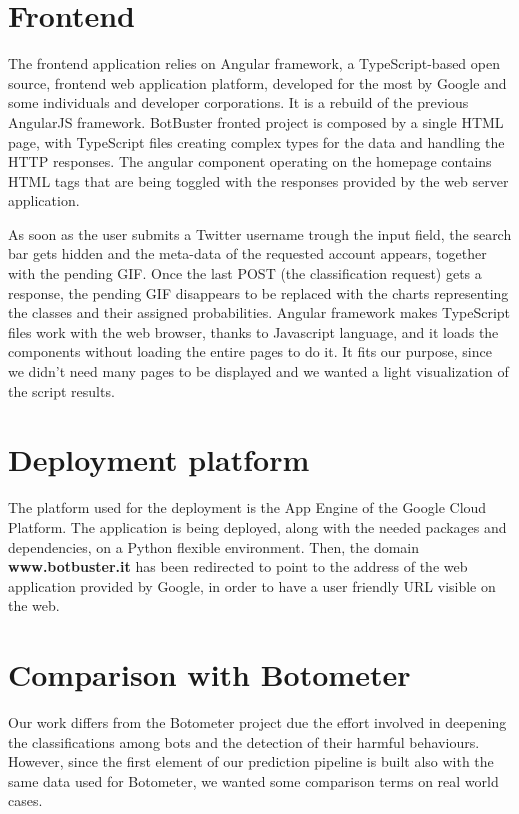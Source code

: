 \section{Frontend}
The frontend application relies on Angular framework, a TypeScript-based open source, frontend web application platform, developed for the most by Google and some individuals and developer corporations.
It is a rebuild of the previous AngularJS framework.
BotBuster fronted project is composed by a single HTML page, with TypeScript files creating complex types for the data and handling the HTTP responses.
The angular component operating on the homepage contains HTML tags that are being toggled with the responses provided by the web server application.

As soon as the user submits a Twitter username trough the input field, the search bar gets hidden and the meta-data of the requested account appears, together with the pending GIF. Once the last POST (the classification request) gets a response, the pending GIF disappears to be replaced with the charts representing the classes and their assigned probabilities. 
Angular framework makes TypeScript files work with the web browser, thanks to Javascript language, and it loads the components without loading the entire pages to do it. It fits our purpose, since we didn't need many pages to be displayed and we wanted a light visualization of the script results.

\section{Deployment platform}
The platform used for the deployment is the App Engine of the Google Cloud Platform.
The application is being deployed, along with the needed packages and dependencies, on a Python flexible environment.
Then, the domain \textbf{www.botbuster.it} has been redirected to point to the address of the web application provided by Google, in order to have a user friendly URL visible on the web.
\section{Comparison with Botometer}
Our work differs from the Botometer project due the effort involved in deepening the classifications among bots and the detection of their harmful behaviours.
However, since the first element of our prediction pipeline is built also with the same data used for Botometer, we wanted some comparison terms on real world cases.

